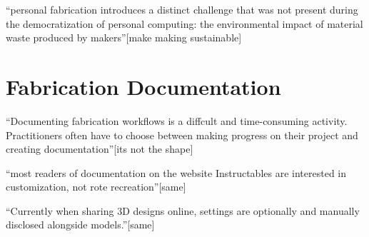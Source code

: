 

``personal fabrication introduces a distinct challenge that was not present during the democratization of personal computing: the environmental impact of material waste produced by makers''[make making sustainable]

\section{Fabrication Documentation}

``Documenting fabrication workflows is a diffcult and time-consuming activity. Practitioners often have to choose between making progress on their project and creating documentation''[its not the shape]

``most readers of documentation on the website Instructables are interested in customization, not rote recreation''[same]

``Currently when sharing 3D designs online, settings are optionally and manually disclosed alongside models.''[same]
